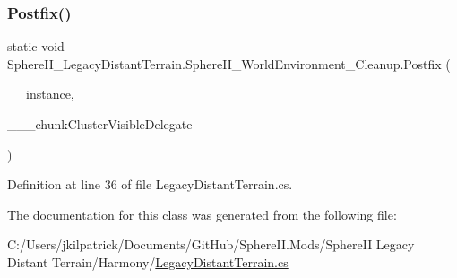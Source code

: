 \subsubsection{\texorpdfstring{Postfix()}{Postfix()}}
{\footnotesize\ttfamily static void Sphere\+I\+I\+\_\+\+Legacy\+Distant\+Terrain.\+Sphere\+I\+I\+\_\+\+World\+Environment\+\_\+\+Cleanup.\+Postfix (\begin{DoxyParamCaption}\item[{World\+Environment}]{\+\_\+\+\_\+instance,  }\item[{Chunk\+Cluster.\+On\+Chunk\+Visible\+Delegate}]{\+\_\+\+\_\+\+\_\+chunk\+Cluster\+Visible\+Delegate }\end{DoxyParamCaption})\hspace{0.3cm}{\ttfamily [static]}}



Definition at line 36 of file Legacy\+Distant\+Terrain.\+cs.



The documentation for this class was generated from the following file\+:\begin{DoxyCompactItemize}
\item 
C\+:/\+Users/jkilpatrick/\+Documents/\+Git\+Hub/\+Sphere\+I\+I.\+Mods/\+Sphere\+I\+I Legacy Distant Terrain/\+Harmony/\mbox{\hyperlink{_legacy_distant_terrain_8cs}{Legacy\+Distant\+Terrain.\+cs}}\end{DoxyCompactItemize}
